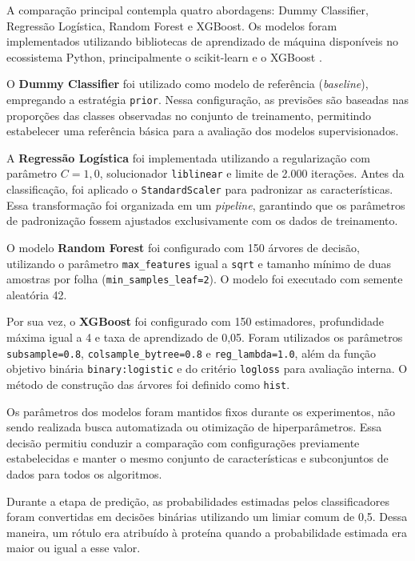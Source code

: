 A comparação principal contempla quatro abordagens: Dummy Classifier, Regressão Logística, Random Forest e XGBoost. Os modelos foram implementados utilizando bibliotecas de aprendizado de máquina disponíveis no ecossistema Python, principalmente o scikit-learn e o XGBoost \cite{pedregosa2011,chen2016}.

O \textbf{Dummy Classifier} foi utilizado como modelo de referência (\textit{baseline}), empregando a estratégia \texttt{prior}. Nessa configuração, as previsões são baseadas nas proporções das classes observadas no conjunto de treinamento, permitindo estabelecer uma referência básica para a avaliação dos modelos supervisionados.

A \textbf{Regressão Logística} foi implementada utilizando a regularização com parâmetro $C=1{,}0$, solucionador \texttt{liblinear} e limite de 2.000 iterações. Antes da classificação, foi aplicado o \texttt{StandardScaler} para padronizar as características. Essa transformação foi organizada em um \textit{pipeline}, garantindo que os parâmetros de padronização fossem ajustados exclusivamente com os dados de treinamento.

O modelo \textbf{Random Forest} foi configurado com 150 árvores de decisão, utilizando o parâmetro \texttt{max\_features} igual a \texttt{sqrt} e tamanho mínimo de duas amostras por folha (\texttt{min\_samples\_leaf=2}). O modelo foi executado com semente aleatória 42.

Por sua vez, o \textbf{XGBoost} foi configurado com 150 estimadores, profundidade máxima igual a 4 e taxa de aprendizado de 0,05. Foram utilizados os parâmetros \texttt{subsample=0.8}, \texttt{colsample\_bytree=0.8} e \texttt{reg\_lambda=1.0}, além da função objetivo binária \texttt{binary:logistic} e do critério \texttt{logloss} para avaliação interna. O método de construção das árvores foi definido como \texttt{hist}.

Os parâmetros dos modelos foram mantidos fixos durante os experimentos, não sendo realizada busca automatizada ou otimização de hiperparâmetros. Essa decisão permitiu conduzir a comparação com configurações previamente estabelecidas e manter o mesmo conjunto de características e subconjuntos de dados para todos os algoritmos.

Durante a etapa de predição, as probabilidades estimadas pelos classificadores foram convertidas em decisões binárias utilizando um limiar comum de 0,5. Dessa maneira, um rótulo era atribuído à proteína quando a probabilidade estimada era maior ou igual a esse valor.

